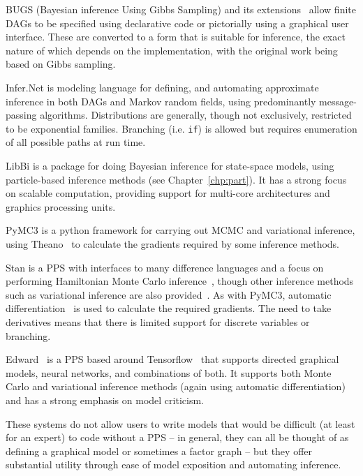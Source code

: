 BUGS (Bayesian inference Using Gibbs Sampling) \citep{spiegelhalter1996bugs} and its 
	extensions~\citep{lunn2000winbugs,plummer2003jags,todeschini2014biips}
	allow finite DAGs to be specified using declarative code or pictorially using a graphical user
	interface.  These are converted to a form that is suitable for inference, the exact nature of which
	depends on the implementation, with the original work being based on Gibbs sampling.
	
Infer.Net \citep{minka_software_2010} is modeling language for defining, and automating approximate inference in
	both DAGs and Markov random fields, using predominantly message-passing algorithms. Distributions
	are generally, though not exclusively, restricted to be exponential families.  Branching (i.e. \texttt{if}) 
	is allowed but requires enumeration of all possible paths at run time.

LibBi \citep{murray2013bayesian} is a package for doing Bayesian inference for state-space models,
	using particle-based inference methods (see Chapter~\ref{chp:part}).  It has a strong focus on scalable
	computation, providing support for multi-core architectures and graphics processing units.

PyMC3 \citep{salvatier2016probabilistic} is a python framework for carrying out MCMC and variational
	inference, using Theano~\citep{bergstra2010theano} to calculate the gradients required by some inference methods.

Stan \citep{carpenter2015stan} is a PPS with interfaces to many difference languages and a
	focus on performing Hamiltonian Monte Carlo inference~\citep{duane1987hybrid,hoffman2014no}, though
	other inference methods such as variational inference are also provided~\citep{kucukelbir2015automatic}.
	As with PyMC3, automatic differentiation~\citep{baydin2015automatic} is used to calculate the required gradients.  The need to take
	derivatives means that there is limited support for discrete variables or branching.
	
Edward~\citep{tran2016edward} is a PPS based around Tensorflow~\citep{abadi2016tensorflow} that
	supports directed graphical models, neural networks, and combinations of both.  It supports both
	Monte Carlo and variational inference methods (again using automatic differentiation) and has a strong emphasis
	on model criticism.

These systems do not allow users to write models that would be difficult (at least for
an expert) to code without a PPS -- in general, they can all be thought of as defining a graphical model
or sometimes a factor graph -- but they offer substantial utility through ease of model exposition and
automating inference.

